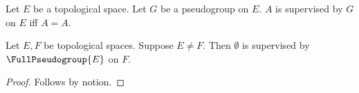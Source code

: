 

\begin{definition}\label{nominal_model_guard}
    Let $E$ be a topological space.
    Let $G$ be a pseudogroup on $E$.
    $A$ is supervised by $G$ on $E$ iff $A=A$.
\end{definition}

\begin{proposition}\label{nominal_wrong_model}
    Let $E,F$ be topological spaces.
    Suppose $E\neq F$.
    Then $\emptyset$ is supervised by $\FullPseudogroup{E}$ on $F$.
\end{proposition}
\begin{proof}
    Follows by notion.
\end{proof}
